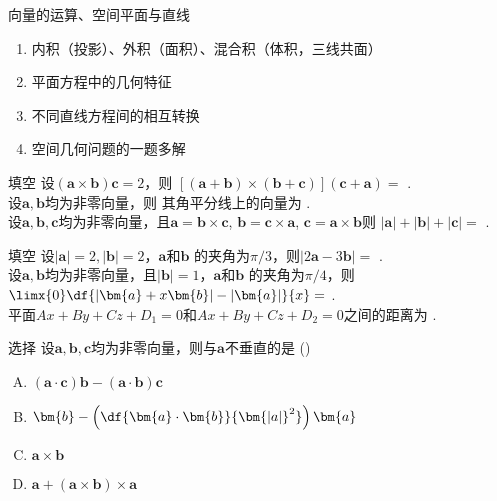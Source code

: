 \begin{frame}{向量的运算、空间平面与直线}
	\linespread{1.2}
	\begin{enumerate}
	  \item 内积（投影）、外积（面积）、混合积（体积，三线共面）
	  \item 平面方程中的几何特征
	  \item 不同直线方程间的相互转换
	  \item 空间几何问题的一题多解
	\end{enumerate}
\end{frame}

\begin{frame}{填空}
	\linespread{1.2}
	设$(\bm{a}\times\bm{b})\bm{c}=2$，则
	$[(\bm{a}+\bm{b})\times(\bm{b}+\bm{c})](\bm{c}+\bm{a})=$
	\underline{\;}.\\[1em]
	
	设$\bm{a},\bm{b}$均为非零向量，则
	其角平分线上的向量为
	\underline{\;}.\\[1em]
	
	设$\bm{a},\bm{b},\bm{c}$均为非零向量，且$\bm{a}=\bm{b}\times\bm{c}$,
	$\bm{b}=\bm{c}\times\bm{a}$,
	$\bm{c}=\bm{a}\times\bm{b}$则
	$|\bm{a}|+|\bm{b}|+|\bm{c}|=$
	\underline{\;}.\\[1em]
\end{frame}

\begin{frame}{填空}
	\linespread{1.2}
	设$|\bm{a}|=2,|\bm{b}|=2$，$\bm{a}$和$\bm{b}$
	的夹角为$\pi/3$，则$|2\bm{a}-3\bm{b}|=$
	\underline{\;}.\\[1em]
	
	设$\bm{a},\bm{b}$均为非零向量，且$|\bm{b}|=1$，$\bm{a}$和$\bm{b}$
	的夹角为$\pi/4$，则$\limx{0}\df{|\bm{a}+x\bm{b}|-|\bm{a}|}{x}=$
	\underline{\;}.\\[1em]
	
	平面$Ax+By+Cz+D_1=0$和$Ax+By+Cz+D_2=0$之间的距离为
	\underline{\;}.
\end{frame}

\begin{frame}{选择}
	\linespread{1.3}
	设$\bm{a},\bm{b},\bm{c}$均为非零向量，则与$\bm{a}$不垂直的是
	(\underline{\;})
	\begin{enumerate}[(A)]
	  \item $(\bm{a}\cdot\bm{c})\bm{b}-(\bm{a}\cdot\bm{b})\bm{c}$
	  \item $\bm{b}-\left(\df{\bm{a}\cdot\bm{b}}{\bm{|a|}^2}\right)\bm{a}$
	  \item $\bm{a}\times\bm{b}$
	  \item $\bm{a}+(\bm{a}\times\bm{b})\times\bm{a}$
	\end{enumerate}
\end{frame}

